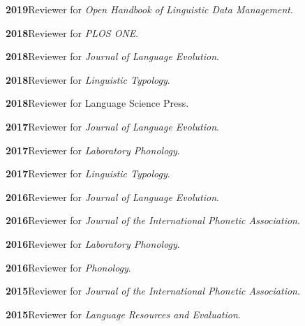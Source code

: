 \documentclass[11pt]{article}
\newcommand{\hangpara}{
 \setlength{\parindent}{0in} %
 \hangindent=0.42in %
}
\begin{document}
\vskip 6pt
\hangpara
{\bf 2019}\hspace{1ex}Reviewer for \textit{Open Handbook of Linguistic Data Management}.

\vskip 6pt
\hangpara
{\bf 2018}\hspace{1ex}Reviewer for \textit{PLOS ONE}.

\vskip 6pt
\hangpara
{\bf 2018}\hspace{1ex}Reviewer for \textit{Journal of Language Evolution}.

\vskip 6pt
\hangpara
{\bf 2018}\hspace{1ex}Reviewer for \textit{Linguistic Typology}.

\vskip 6pt
\hangpara
{\bf 2018}\hspace{1ex}Reviewer for Language Science Press.

\vskip 6pt
\hangpara
{\bf 2017}\hspace{1ex}Reviewer for \textit{Journal of Language Evolution}.

\vskip 6pt
\hangpara
{\bf 2017}\hspace{1ex}Reviewer for \textit{Laboratory Phonology}.

\vskip 6pt
\hangpara
{\bf 2017}\hspace{1ex}Reviewer for \textit{Linguistic Typology}.

\vskip 6pt
\hangpara
{\bf 2016}\hspace{1ex}Reviewer for \textit{Journal of Language Evolution}.

\vskip 6pt
\hangpara
{\bf 2016}\hspace{1ex}Reviewer for \textit{Journal of the International Phonetic Association}.

\vskip 6pt
\hangpara
{\bf 2016}\hspace{1ex}Reviewer for \textit{Laboratory Phonology}.

\vskip 6pt
\hangpara
{\bf 2016}\hspace{1ex}Reviewer for \textit{Phonology}.

\vskip 6pt
\hangpara
{\bf 2015}\hspace{1ex}Reviewer for \textit{Journal of the International Phonetic Association}.


\vskip 6pt
\hangpara
{\bf 2015}\hspace{1ex}Reviewer for \textit{Language Resources and Evaluation}.
\end{document}
